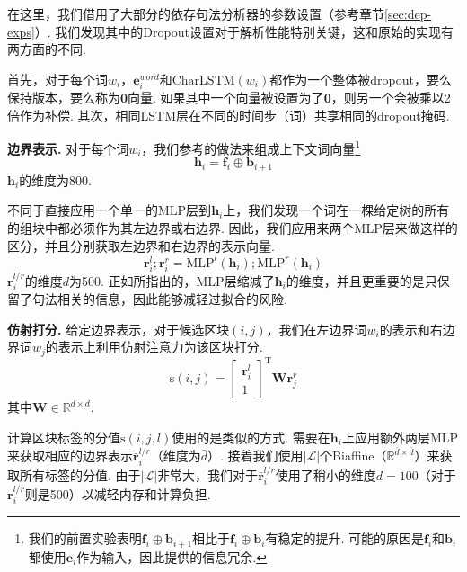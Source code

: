 在这里，我们借用了大部分\cite{Timothy-d17-biaffine}的依存句法分析器的参数设置（参考章节\ref{sec:dep-exps}）.
我们发现其中的Dropout设置对于解析性能特别关键，这和原始的实现\cite{stern-etal-2017-minimal}有两方面的不同.

首先，对于每个词$w_i$，$\mathbf{e}^{word}_i$和$\mathrm{CharLSTM}(w_i)$都作为一个整体被dropout，要么保持版本，要么称为$\mathbf{0}$向量.
如果其中一个向量被设置为了$\mathbf{0}$，则另一个会被乘以2倍作为补偿.
其次，相同LSTM层在不同的时间步（词）共享相同的dropout掩码\cite{yarin-etal-2016-dropout}.

\noindent\textbf{边界表示.}
对于每个词$w_i$，我们参考\cite{stern-etal-2017-minimal}的做法来组成上下文词向量\footnote{我们的前置实验表明$\mathbf{f}_i \oplus \mathbf{b}_{i+1}$相比于$\mathbf{f}_i \oplus \mathbf{b}_i$有稳定的提升. 可能的原因是$\mathbf{f}_i$和$\mathbf{b}_i$都使用$\mathbf{e}_i$作为输入，因此提供的信息冗余.}
\begin{equation}
    \mathbf{h}_i = \mathbf{f}_i \oplus \mathbf{b}_{i+1}
\end{equation}
$\mathbf{h}_i$的维度为800.

不同于直接应用一个单一的MLP层到$\mathbf{h}_i$上，我们发现一个词在一棵给定树的所有的组块中都必须作为其左边界或右边界.
因此，我们应用来两个MLP层来做这样的区分，并且分别获取左边界和右边界的表示向量.
\begin{equation}
    \label{mlp-borlders}
    \mathbf{r}_i^{l}; \mathbf{r}_i^{r} =\mathrm{MLP}^{l} \left( \mathbf{h}_i \right); \mathrm{MLP}^{r} \left( \mathbf{h}_i \right)
\end{equation}
$\mathbf{r}_i^{l/r}$的维度$d$为500.
正如\cite{Timothy-d17-biaffine}所指出的，MLP层缩减了$\mathbf{h}_i$的维度，并且更重要的是只保留了句法相关的信息，因此能够减轻过拟合的风险.

\noindent\textbf{仿射打分.}
给定边界表示，对于候选区块$(i,j)$，我们在左边界词$w_i$的表示和右边界词$w_j$的表示上利用仿射注意力为该区块打分.
\begin{equation} \label{eq:biaffine}
    \mathrm{s}(i,j) =  \left[
        \begin{array}{c}
            \mathbf{r}_{i}^{l} \\
            1
        \end{array}
        \right]^\mathrm{T}
    \mathbf{W} \mathbf{r}_{j}^{r}
\end{equation}
其中$\mathbf{W} \in \mathbb{R}^{d \times d}$.

计算区块标签的分值$\mathrm{s}(i,j,l)$使用的是类似的方式.
需要在$\mathbf{h}_i$上应用额外两层MLP来获取相应的边界表示$\bar{\mathbf{r}}^{l/r}_i$（维度为$\bar{d}$）.
接着我们使用$|\mathcal{L}|$个Biaffine（$\mathbb{R}^{\bar{d} \times \bar{d}}$）来获取所有标签的分值.
由于$|\mathcal{L}|$非常大，我们对于$\bar{\mathbf{r}}^{l/r}_i$使用了稍小的维度$\bar{d}=100$（对于${\mathbf{r}}^{l/r}_i$则是500）以减轻内存和计算负担.

